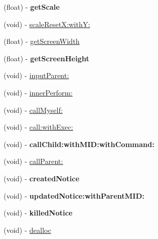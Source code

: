 \begin{DoxyCompactItemize}
\item 
\hypertarget{interface_messenger_view_controller_a97b35c6553c0ec2e6aae62ec4f4e8db4}{
(float) -\/ {\bfseries getScale}}
\label{d7/d34/interface_messenger_view_controller_a97b35c6553c0ec2e6aae62ec4f4e8db4}

\item 
(void) -\/ \hyperlink{interface_messenger_view_controller_a9a0f05d1d3a3685a3d3ce7632c2bc7ee}{scaleResetX:withY:}
\item 
(float) -\/ \hyperlink{interface_messenger_view_controller_aa76c05b79b38d78ee26b4fb8be95d6eb}{getScreenWidth}
\item 
\hypertarget{interface_messenger_view_controller_ac972de3488458cbf0f7c60b46fde71ad}{
(float) -\/ {\bfseries getScreenHeight}}
\label{d7/d34/interface_messenger_view_controller_ac972de3488458cbf0f7c60b46fde71ad}

\item 
(void) -\/ \hyperlink{interface_messenger_view_controller_a33bb3cca76fba84a3e5b480131e5faf1}{inputParent:}
\item 
(void) -\/ \hyperlink{interface_messenger_view_controller_a2c415df83e46605177105d75c714e463}{innerPerform:}
\item 
(void) -\/ \hyperlink{interface_messenger_view_controller_a416d9acd2e8346b9ab8870b64571f322}{callMyself:}
\item 
(void) -\/ \hyperlink{interface_messenger_view_controller_a7a416a5ec2bcd17f259e1b2fc017d6a6}{call:withExec:}
\item 
\hypertarget{interface_messenger_view_controller_a95e335be7444d6a9fd4631fa8a5f9f3e}{
(void) -\/ {\bfseries callChild:withMID:withCommand:}}
\label{d7/d34/interface_messenger_view_controller_a95e335be7444d6a9fd4631fa8a5f9f3e}

\item 
(void) -\/ \hyperlink{interface_messenger_view_controller_afa8cf33ccddb2f83e214b192707bdbd6}{callParent:}
\item 
\hypertarget{interface_messenger_view_controller_ae8415c3e0079cb51a8374a47efa0bbd2}{
(void) -\/ {\bfseries createdNotice}}
\label{d7/d34/interface_messenger_view_controller_ae8415c3e0079cb51a8374a47efa0bbd2}

\item 
\hypertarget{interface_messenger_view_controller_a975afc92bea2290fcae8b57ab85985d3}{
(void) -\/ {\bfseries updatedNotice:withParentMID:}}
\label{d7/d34/interface_messenger_view_controller_a975afc92bea2290fcae8b57ab85985d3}

\item 
\hypertarget{interface_messenger_view_controller_abf4d1e2b5e6cd851f60601482ec500ef}{
(void) -\/ {\bfseries killedNotice}}
\label{d7/d34/interface_messenger_view_controller_abf4d1e2b5e6cd851f60601482ec500ef}

\item 
(void) -\/ \hyperlink{interface_messenger_view_controller_a764894e696ddb4254c216dbb8d58b279}{dealloc}
\end{DoxyCompactItemize}
